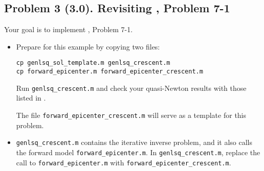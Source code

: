 \documentclass[11pt,titlepage,fleqn]{article}
\begin{document}

\subsection*{Problem 3 (3.0). Revisiting \citet{Tarantola2005}, Problem 7-1}

Your goal is to implement \citet{Tarantola2005}, Problem 7-1.
%
\begin{itemize}
\item Prepare for this example by copying two files:
%
\begin{verbatim}
cp genlsq_sol_template.m genlsq_crescent.m
cp forward_epicenter.m forward_epicenter_crescent.m
\end{verbatim}
%
Run \verb+genlsq_crescent.m+ and check your quasi-Newton results with those listed in .

The file \verb+forward_epicenter_crescent.m+ will serve as a template for this problem.

\item \verb+genlsq_crescent.m+ contains the iterative inverse problem, and it also calls the forward model \verb+forward_epicenter.m+. In \verb+genlsq_crescent.m+, replace the call to \verb+forward_epicenter.m+ with \verb+forward_epicenter_crescent.m+.

\end{itemize}

\end{document}
